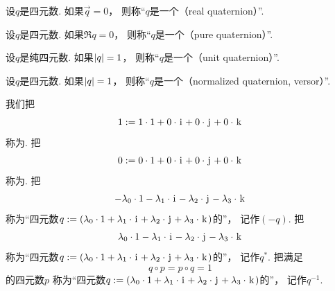 \begin{definition}
设\(q\)是四元数.
如果\(\vec{q} = 0\)，
则称“\(q\)是一个（real quaternion）”.
\end{definition}

\begin{definition}
设\(q\)是四元数.
如果\(\Re q = 0\)，
则称“\(q\)是一个（pure quaternion）”.
\end{definition}

\begin{definition}
设\(q\)是纯四元数.
如果\(\abs{q} = 1\)，
则称“\(q\)是一个（unit quaternion）”.
\end{definition}

\begin{definition}
设\(q\)是四元数.
如果\(\abs{q} = 1\)，
则称“\(q\)是一个（normalized quaternion, versor）”.
\end{definition}

我们把\begin{equation*}
	1 := 1 \cdot 1 + 0 \cdot \kern1pt\mathrm{i}\kern1pt + 0 \cdot \kern1pt\mathrm{j}\kern1pt + 0 \cdot \kern1pt\mathrm{k}\kern1pt
\end{equation*}
称为.
把\begin{equation*}
	0 := 0 \cdot 1 + 0 \cdot \kern1pt\mathrm{i}\kern1pt + 0 \cdot \kern1pt\mathrm{j}\kern1pt + 0 \cdot \kern1pt\mathrm{k}\kern1pt
\end{equation*}
称为.
把\begin{equation*}
	- \lambda_0 \cdot 1
	- \lambda_1 \cdot \kern1pt\mathrm{i}\kern1pt
	- \lambda_2 \cdot \kern1pt\mathrm{j}\kern1pt
	- \lambda_3 \cdot \kern1pt\mathrm{k}\kern1pt
\end{equation*}
称为“四元数\(
	q
	:=
	(
		\lambda_0 \cdot 1
		+ \lambda_1 \cdot \kern1pt\mathrm{i}\kern1pt
		+ \lambda_2 \cdot \kern1pt\mathrm{j}\kern1pt
		+ \lambda_3 \cdot \kern1pt\mathrm{k}\kern1pt
	)
\)的”，
记作\((-q)\).
把\begin{equation*}
	\lambda_0 \cdot 1
	- \lambda_1 \cdot \kern1pt\mathrm{i}\kern1pt
	- \lambda_2 \cdot \kern1pt\mathrm{j}\kern1pt
	- \lambda_3 \cdot \kern1pt\mathrm{k}\kern1pt
\end{equation*}
称为“四元数\(
	q
	:=
	(
		\lambda_0 \cdot 1
		+ \lambda_1 \cdot \kern1pt\mathrm{i}\kern1pt
		+ \lambda_2 \cdot \kern1pt\mathrm{j}\kern1pt
		+ \lambda_3 \cdot \kern1pt\mathrm{k}\kern1pt
	)
\)的”，
记作\(q^*\).
把满足\begin{equation*}
	q \circ p = p \circ q = 1
\end{equation*}
的四元数\(p\)
称为“四元数\(
	q
	:=
	(
		\lambda_0 \cdot 1
		+ \lambda_1 \cdot \kern1pt\mathrm{i}\kern1pt
		+ \lambda_2 \cdot \kern1pt\mathrm{j}\kern1pt
		+ \lambda_3 \cdot \kern1pt\mathrm{k}\kern1pt
	)
\)的”，
记作\(q^{-1}\).

